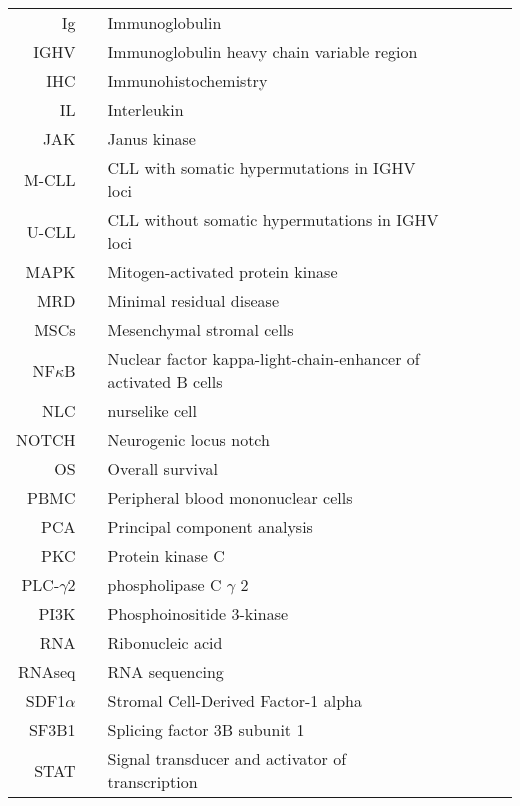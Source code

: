 \documentclass[11pt, a4paper, twosided]{book}
\begin{document}
\newpage   
\begin{tabular}{rp{0.2cm}lp{1cm}rp{0.2cm}l}
    
    
  Ig & & Immunoglobulin \\
    IGHV & & Immunoglobulin heavy chain variable region \\
    IHC & & Immunohistochemistry \\
    IL & & Interleukin \\
    JAK & & Janus kinase \\
    M-CLL & & CLL with somatic hypermutations in IGHV loci \\
    U-CLL & & CLL without somatic hypermutations in IGHV loci \\
    MAPK & & Mitogen-activated protein kinase  \\
    MRD & & Minimal residual disease  \\
    MSCs & & Mesenchymal stromal cells  \\
    NF$\kappa$B & & Nuclear factor kappa-light-chain-enhancer of activated B cells \\
    NLC & & nurselike cell  \\
    NOTCH & & Neurogenic locus notch  \\
    OS & & Overall survival \\
    PBMC & & Peripheral blood mononuclear cells \\
    PCA & & Principal component analysis \\
    PKC & & Protein kinase C \\
    PLC-$\gamma$2 & & phospholipase C $\gamma$ 2 \\
    PI3K & & Phosphoinositide 3-kinase \\
    RNA & & Ribonucleic acid  \\
    RNAseq & & RNA sequencing \\
    SDF1$\alpha$ & & Stromal Cell-Derived Factor-1 alpha  \\
    SF3B1 & & Splicing factor 3B subunit 1 \\
    STAT & & Signal transducer and activator of transcription \\
    
\end{tabular}
\newpage
\end{document}
